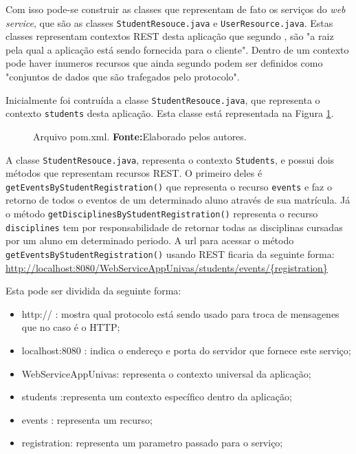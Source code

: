 	\par Com isso pode-se construir as classes que representam de fato os serviços
do \textit{web service}, que são as classes \texttt{StudentResouce.java} e
\texttt{UserResource.java}. Estas classes representam contextos REST desta
aplicação que segundo , são "a raiz pela qual a
aplicação está sendo fornecida para o cliente". Dentro de um contexto pode haver
inumeros recursos que ainda segundo  podem ser
definidos como "conjuntos de dados que são trafegados pelo protocolo".

	\par Inicialmente foi contruída a classe \texttt{StudentResouce.java}, que
representa o contexto \texttt{students} desta aplicação. Esta classe está
representada na Figura \ref{fig:desws24}.

	\begin{figure}[h!]
		
		\caption[Arquivo \texttt{pom.xml}]{Arquivo pom.xml.
		\textbf{Fonte:}Elaborado pelos autores.}
		\label{fig:desws24}
	\end{figure}
		
	\par A classe \texttt{StudentResouce.java}, representa o contexto
\texttt{Students}, e possui dois métodos que representam recursos REST. O
primeiro deles é \texttt{getEventsByStudentRegistration()} que representa o
recurso \texttt{events} e faz o retorno de todos o eventos de um determinado
aluno através de sua matrícula. Já o método
\texttt{getDisciplinesByStudentRegistration()} representa o recurso
\texttt{disciplines} tem por responsabilidade de retornar todas as disciplinas
cursadas por um aluno em determinado periodo. A url para acessar o método
\texttt{getEventsByStudentRegistration()} usando REST ficaria da seguinte
forma:\\
\url{http://localhost:8080/WebServiceAppUnivas/students/events/{registration}}
	
	\par Esta pode ser dividida da seguinte forma:

	\begin{itemize}
	  \item http:// : mostra qual protocolo está sendo usado para troca de
	  mensagenes que no caso é o HTTP;
	  \item localhost:8080 : indica o endereço e porta do servidor que fornece este
	  serviço;
	  \item WebServiceAppUnivas: representa o contexto universal da aplicação; 
	  \item students :representa um contexto específico dentro da aplicação;
	  \item events : representa um recurso;
	  \item registration: representa um parametro passado para o serviço;
	\end{itemize}

